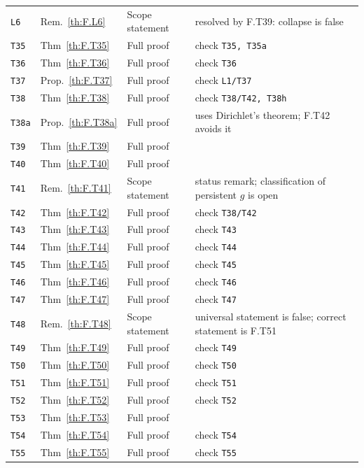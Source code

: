 \begin{longtable}{@{}p{14mm}p{17mm}p{27mm}p{58mm}@{}}
\texttt{L6} & Rem.~\ref{th:F.L6} & Scope statement & resolved by F.T39: collapse is false \\
\texttt{T35} & Thm~\ref{th:F.T35} & Full proof & check \texttt{T35, T35a} \\
\texttt{T36} & Thm~\ref{th:F.T36} & Full proof & check \texttt{T36} \\
\texttt{T37} & Prop.~\ref{th:F.T37} & Full proof & check \texttt{L1/T37} \\
\texttt{T38} & Thm~\ref{th:F.T38} & Full proof & check \texttt{T38/T42, T38h} \\
\texttt{T38a} & Prop.~\ref{th:F.T38a} & Full proof & uses Dirichlet's theorem; F.T42 avoids it \\
\texttt{T39} & Thm~\ref{th:F.T39} & Full proof &  \\
\texttt{T40} & Thm~\ref{th:F.T40} & Full proof &  \\
\texttt{T41} & Rem.~\ref{th:F.T41} & Scope statement & status remark; classification of persistent $g$ is open \\
\texttt{T42} & Thm~\ref{th:F.T42} & Full proof & check \texttt{T38/T42} \\
\texttt{T43} & Thm~\ref{th:F.T43} & Full proof & check \texttt{T43} \\
\texttt{T44} & Thm~\ref{th:F.T44} & Full proof & check \texttt{T44} \\
\texttt{T45} & Thm~\ref{th:F.T45} & Full proof & check \texttt{T45} \\
\texttt{T46} & Thm~\ref{th:F.T46} & Full proof & check \texttt{T46} \\
\texttt{T47} & Thm~\ref{th:F.T47} & Full proof & check \texttt{T47} \\
\texttt{T48} & Rem.~\ref{th:F.T48} & Scope statement & universal statement is false; correct statement is F.T51 \\
\texttt{T49} & Thm~\ref{th:F.T49} & Full proof & check \texttt{T49} \\
\texttt{T50} & Thm~\ref{th:F.T50} & Full proof & check \texttt{T50} \\
\texttt{T51} & Thm~\ref{th:F.T51} & Full proof & check \texttt{T51} \\
\texttt{T52} & Thm~\ref{th:F.T52} & Full proof & check \texttt{T52} \\
\texttt{T53} & Thm~\ref{th:F.T53} & Full proof &  \\
\texttt{T54} & Thm~\ref{th:F.T54} & Full proof & check \texttt{T54} \\
\texttt{T55} & Thm~\ref{th:F.T55} & Full proof & check \texttt{T55} \\

\end{longtable}
